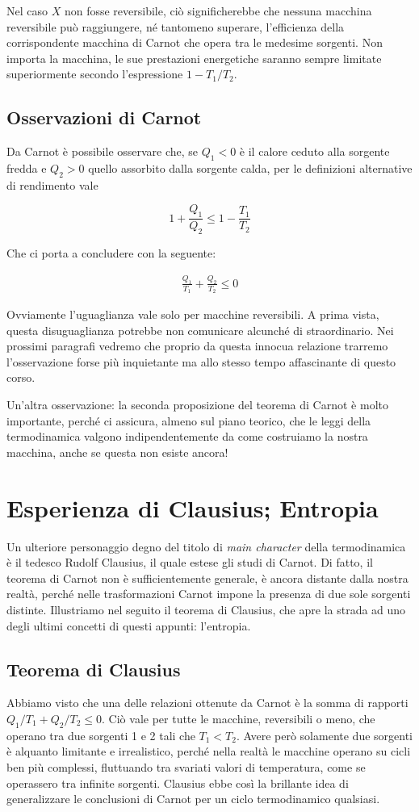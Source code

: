 Nel caso $X$ non fosse reversibile, ciò significherebbe che
nessuna macchina reversibile può raggiungere, né tantomeno
superare, l'efficienza della corrispondente macchina di Carnot
che opera tra le medesime sorgenti. Non importa la macchina,
le sue prestazioni energetiche saranno sempre limitate superiormente
secondo l'espressione $1 - T_1/T_2$.

\subsection{Osservazioni di Carnot}
Da Carnot è possibile osservare che, se $Q_1 < 0$ è il calore ceduto
alla sorgente fredda e $Q_2 > 0$ quello assorbito dalla sorgente
calda, per le definizioni alternative di rendimento vale

\[ 1 + \frac{Q_1}{Q_2} \leq 1 - \frac{T_1}{T_2} \]

\noindent Che ci porta a concludere con la seguente:

\begin{align}
    \frac{Q_1}{T_1} + \frac{Q_2}{T_2} \leq 0
\end{align}

\noindent Ovviamente l'uguaglianza vale solo per macchine reversibili.
A prima vista, questa disuguaglianza potrebbe non comunicare
alcunché di straordinario. Nei prossimi paragrafi vedremo che
proprio da questa innocua relazione trarremo l'osservazione
forse più inquietante ma allo stesso tempo affascinante di
questo corso.

Un'altra osservazione: la seconda proposizione del teorema di Carnot
è molto importante, perché ci assicura, almeno sul piano teorico, che
le leggi della termodinamica valgono indipendentemente da come costruiamo
la nostra macchina, anche se questa non esiste ancora!

\section{Esperienza di Clausius; Entropia}
Un ulteriore personaggio degno del titolo di \textit{main character}
della termodinamica è il tedesco Rudolf Clausius, il quale estese
gli studi di Carnot. Di fatto, il teorema di Carnot non è sufficientemente
generale, è ancora distante dalla nostra realtà, perché nelle trasformazioni
Carnot impone la presenza di due sole sorgenti distinte. Illustriamo nel seguito
il teorema di Clausius, che apre la strada ad uno degli ultimi concetti di questi
appunti: l'entropia.

\subsection{Teorema di Clausius}
Abbiamo visto che una delle relazioni ottenute da Carnot è la
somma di rapporti $Q_1/T_1 + Q_2/T_2 \leq 0$. Ciò vale per tutte
le macchine, reversibili o meno, che operano tra due sorgenti 1
e 2 tali che $T_1 < T_2$. Avere però solamente due sorgenti è
alquanto limitante e irrealistico, perché nella realtà le macchine
operano su cicli ben più complessi, fluttuando tra svariati valori
di temperatura, come se operassero tra infinite sorgenti. Clausius
ebbe così la brillante idea di generalizzare le conclusioni di
Carnot per un ciclo termodinamico qualsiasi.

